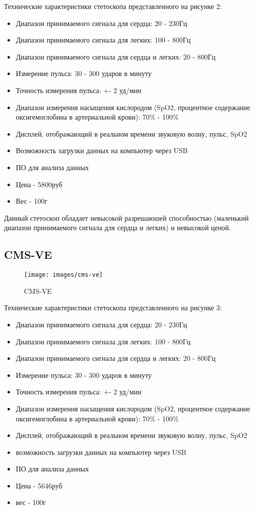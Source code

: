 \documentclass[../main.tex]{subfiles}
\begin{document}
Технические характеристики \cite{cms-vesd} стетоскопа представленного на рисунке 2:
\begin{itemize}
  \item Диапазон принимаемого сигнала для сердца: 20 - 230Гц
  \item Диапазон принимаемого сигнала для легких: 100 - 800Гц
  \item Диапазон принимаемого сигнала для сердца и легких: 20 - 800Гц
  \item Измерение пульса: 30 - 300 ударов в минуту
  \item Точность измерения пульса: +- 2 уд/мин
  \item Диапазон измерения насыщения кислородом (SpO2, процентное содержание оксигемоглобина в артериальной крови): 70\% - 100\%
  \item Дисплей, отображающий в реальном времени звуковую волну, пульс, SpO2
  \item Возможность загрузки данных на компьютер через USB
  \item ПО для анализа данных
  \item Цена - 5800руб
  \item Вес - 100г
\end{itemize}

Данный стетоскоп обладает невысокой разрешаюшей способностью (маленький диапазон принимаемого сигнала для сердца и легких) и невысокой ценой.

\subsection{CMS-VE}
\begin{figure}[H]
\centering
\texttt{[image: images/cms-ve]}
\caption{CMS-VE}
\end{figure}

Технические характеристики \cite{cms-ve} стетоскопа представленного на рисунке 3:
\begin{itemize}
  \item Диапазон принимаемого сигнала для сердца: 20 - 230Гц
  \item Диапазон принимаемого сигнала для легких: 100 - 800Гц
  \item Диапазон принимаемого сигнала для сердца и легких: 20 - 800Гц
  \item Измерение пульса: 30 - 300 ударов в минуту
  \item Точность измерения пульса: +- 2 уд/мин
  \item Диапазон измерения насыщения кислородом (SpO2, процентное содержание оксигемоглобина в артериальной крови): 70\% - 100\%
  \item Дисплей, отображающий в реальном времени звуковую волну, пульс, SpO2
  \item возможность загрузки данных на компьютер через USB
  \item ПО для анализа данных
  \item Цена - 5646руб
  \item вес - 100г
\end{itemize}
\end{document}
